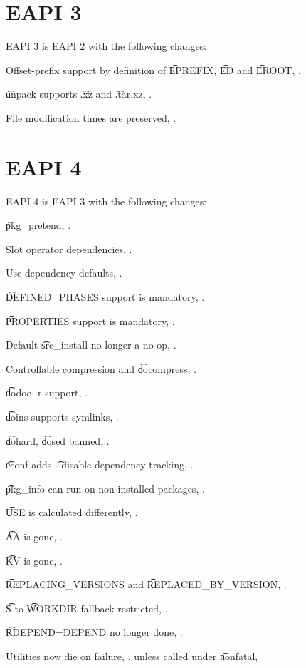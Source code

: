 \section*{EAPI 3}

EAPI 3 is EAPI 2 with the following changes:
\begin{compactitem}
\item Offset-prefix support by definition of \t{EPREFIX}, \t{ED} and \t{EROOT},
    .
\item \t{unpack} supports \t{.xz} and \t{.tar.xz}, .
\item File modification times are preserved, .
\end{compactitem}

\section*{EAPI 4}

EAPI 4 is EAPI 3 with the following changes:

\begin{compactitem}
\item \t{pkg\_pretend}, .
\item Slot operator dependencies, .
\item Use dependency defaults, .
\item \t{DEFINED\_PHASES} support is mandatory, .
\item \t{PROPERTIES} support is mandatory, .
\item Default \t{src\_install} no longer a no-op, .
\item Controllable compression and \t{docompress}, .
\item \t{dodoc -r} support, .
\item \t{doins} supports symlinks, .
\item \t{dohard}, \t{dosed} banned, .
\item \t{econf} adds \t{-{}-disable-dependency-tracking}, .
\item \t{pkg\_info} can run on non-installed packages, .
\item \t{USE} is calculated differently, .
\item \t{AA} is gone, .
\item \t{KV} is gone, .
\item \t{REPLACING\_VERSIONS} and \t{REPLACED\_BY\_VERSION}, .
\item \t{S} to \t{WORKDIR} fallback restricted, .
\item \t{RDEPEND=DEPEND} no longer done, .
\item Utilities now die on failure, , unless called under \t{nonfatal},
\end{compactitem}


